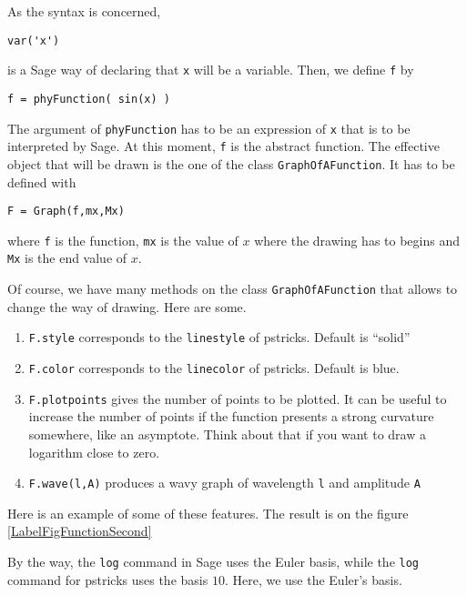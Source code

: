 As the syntax is concerned, 
\begin{verbatim}
var('x')
\end{verbatim}
is a Sage way of declaring that \verb+x+ will be a variable. Then, we define \verb+f+ by
\begin{verbatim}
f = phyFunction( sin(x) )
\end{verbatim}
The argument of \verb+phyFunction+ has to be an expression of \verb+x+ that is to be interpreted by Sage. At this moment, \verb+f+ is the abstract function. The effective object that will be drawn is the one of the class \verb+GraphOfAFunction+. It has to be defined with
\begin{verbatim}
F = Graph(f,mx,Mx)
\end{verbatim}
where \verb+f+ is the function, \verb+mx+ is the value of $x$ where the drawing has to begins and \verb+Mx+ is the end value of $x$.

Of course, we have many methods on the class \verb+GraphOfAFunction+ that allows to change the way of drawing. Here are some.
\begin{enumerate}

	\item
		\verb+F.style+ corresponds to the \verb+linestyle+ of pstricks. Default is ``solid''
	\item 
		\verb+F.color+ corresponds to the \verb+linecolor+ of pstricks. Default is blue.
	\item
		\verb+F.plotpoints+ gives the number of points to be plotted. It can be useful to increase the number of points if  the function presents a strong curvature somewhere, like an asymptote. Think about that if you want to draw a logarithm close to zero.
	\item
		\verb+F.wave(l,A)+ produces a wavy graph of wavelength \verb+l+ and amplitude \verb+A+

\end{enumerate}

Here is an example of some of these features.
The result is on the figure \ref{LabelFigFunctionSecond}
\newcommand{\CaptionFigFunctionSecond}{A second example of function.}

By the way, the \verb+log+ command in Sage uses the Euler basis, while the \verb+log+ command for pstricks uses the basis $10$. Here, we use the Euler's basis.



